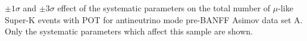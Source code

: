 \begin{table}
	\begin{adjustbox}{width=\textwidth, totalheight=\textheight, keepaspectratio}
		
	\end{adjustbox}
	\caption
	{
		$\pm1\sigma$ and $\pm3\sigma$ effect of the systematic parameters on the total number of $\mu$-like Super-K events with \RunPeriod POT for antineutrino mode pre-BANFF Asimov data set A. Only the systematic parameters which affect this sample are shown.
	}
\end{table}\clearpage
